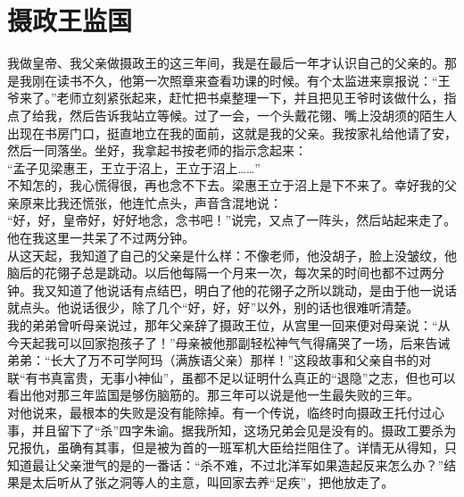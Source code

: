 \fancyhead[RO]{} %
\fancyhead[LE]{} %
\chapter*{摄政王监国}
\thispagestyle{empty}
我做皇帝、我父亲做摄政王的这三年间，我是在最后一年才认识自己的父亲的。那是我刚在读书不久，他第一次照章来查看功课的时候。有个太监进来禀报说：“王爷来了。”老师立刻紧张起来，赶忙把书桌整理一下，并且把见王爷时该做什么，指点了给我，然后告诉我站立等候。过了一会，一个头戴花翎、嘴上没胡须的陌生人出现在书房门口，挺直地立在我的面前，这就是我的父亲。我按家礼给他请了安，然后一同落坐。坐好，我拿起书按老师的指示念起来：\\

“孟子见梁惠王，王立于沼上，王立于沼上……”\\

不知怎的，我心慌得很，再也念不下去。梁惠王立于沼上是下不来了。幸好我的父亲原来比我还慌张，他连忙点头，声音含混地说：\\

“好，好，皇帝好，好好地念，念书吧！”说完，又点了一阵头，然后站起来走了。他在我这里一共呆了不过两分钟。\\

从这天起，我知道了自己的父亲是什么样：不像老师，他没胡子，脸上没皱纹，他脑后的花翎子总是跳动。以后他每隔一个月来一次，每次呆的时间也都不过两分钟。我又知道了他说话有点结巴，明白了他的花翎子之所以跳动，是由于他一说话就点头。他说话很少，除了几个“好，好，好”以外，别的话也很难听清楚。\\

我的弟弟曾听母亲说过，那年父亲辞了摄政王位，从宫里一回来便对母亲说：“从今天起我可以回家抱孩子了！”母亲被他那副轻松神气气得痛哭了一场，后来告诫弟弟：“长大了万不可学阿玛（满族语父亲）那样！”这段故事和父亲自书的对联“有书真富贵，无事小神仙”，虽都不足以证明什么真正的“退隐”之志，但也可以看出他对那三年监国是够伤脑筋的。那三年可以说是他一生最失败的三年。\\

对他说来，最根本的失败是没有能除掉。有一个传说，临终时向摄政王托付过心事，并且留下了“杀”四字朱谕。据我所知，这场兄弟会见是没有的。摄政工要杀为兄报仇，虽确有其事，但是被为首的一班军机大臣给拦阻住了。详情无从得知，只知道最让父亲泄气的是的一番话：“杀不难，不过北洋军如果造起反来怎么办？”结果是太后听从了张之洞等人的主意，叫回家去养“足疾”，把他放走了。\\

